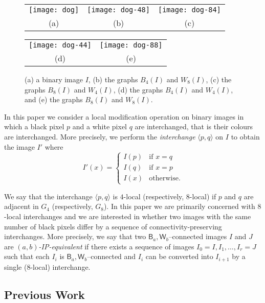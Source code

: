 \documentclass[lotsofwhite,charterfonts]{patmorin}
\newcommand{\ic}[2]{\langle #1,#2 \rangle}
\begin{document}
\begin{figure}[htbp]
\begin{center}\begin{tabular}{ccc}
\texttt{[image: dog]} & 
\texttt{[image: dog-48]} &
\texttt{[image: dog-84]} \\
(a) & (b) & (c) \\
\end{tabular}\end{center}
\begin{center}\begin{tabular}{cc}
\texttt{[image: dog-44]} & \texttt{[image: dog-88]} \\
(d) & (e) \\
\end{tabular}\end{center}
\caption{(a) a binary image $I$, (b) the graphs $B_4(I)$ and $W_8(I)$, (c)
the graphs $B_8(I)$ and $W_4(I)$, (d) the graphs $B_4(I)$ and $W_4(I)$, and (e) the graphs $B_8(I)$ and $W_8(I)$.}
\end{figure}


In this paper we consider a local modification operation on binary
images in which a black pixel $p$ and a white pixel $q$ are
interchanged, that is their colours are interchanged.  More precisely, we perform the \emph{interchange}
$\ic{p}{q}$ on $I$ to obtain the image $I'$ where
\[
     I'(x) = \left\{\begin{array}{ll}
         I(p) & \mbox{if $x=q$} \\
         I(q) & \mbox{if $x=p$} \\
         I(x) & \mbox{otherwise.}\end{array}\right.
\]

We say that the interchange $\ic{p}{q}$ is $4$-local (respectively,
$8$-local) if $p$ and $q$ are adjacent in $G_4$ (respectively, $G_8$).
In this paper we are primarily concerned with $8$-local interchanges
and we are interested in whether two images with the same number of
black pixels differ by a sequence of connectivity-preserving
interchanges.  More precisely, we say that two $\textsf{B}_a,\textsf{W}_b$--connected images $I$ and $J$ are \emph{$(a,b)$-IP-equivalent}
\cite{rn02} if there exists a sequence of images $I_0=I,I_1,\ldots,I_r=J$ such that each $I_i$ is $\textsf{B}_a,\textsf{W}_b$--connected and $I_{i}$ can be converted into $I_{i+1}$ by a single (8-local) interchange.

\subsection{Previous Work}
\end{document}
